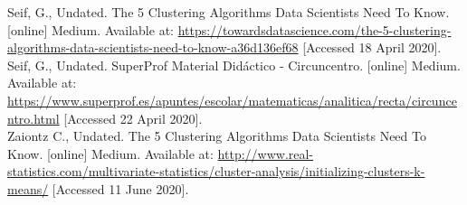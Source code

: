 \documentclass[conference,a4paper]{IEEEtran}
\begin{document}

\clearpage
\begin{thebibliography}{9}
	
	\label{bib:georgeSeif}
	Seif, G., Undated. The 5 Clustering Algorithms Data Scientists Need To Know. [online] Medium. 
	Available at: \href{https://towardsdatascience.com/the-5-clustering-algorithms-data-scientists-need-to-know-a36d136ef68}{https://towardsdatascience.com/the-5-clustering-algorithms-data-scientists-need-to-know-a36d136ef68}
	[Accessed 18 April 2020].\\

	\label{bib:georgeSeif2}
	Seif, G., Undated. SuperProf Material Didáctico - Circuncentro. [online] Medium. 
	Available at: \href{https://www.superprof.es/apuntes/escolar/matematicas/analitica/recta/circuncentro.html}{https://www.superprof.es/apuntes/escolar/matematicas/analitica/recta/circuncentro.html}
	[Accessed 22 April 2020].\\
	
	\label{bib:clustering}
	Zaiontz C., Undated. The 5 Clustering Algorithms Data Scientists Need To Know. [online] Medium. 
	Available at: \href{ http://www.real-statistics.com/multivariate-statistics/cluster-analysis/initializing-clusters-k-means/}{ http://www.real-statistics.com/multivariate-statistics/cluster-analysis/initializing-clusters-k-means/}
	[Accessed 11 June 2020].

\end{thebibliography}
\end{document}
